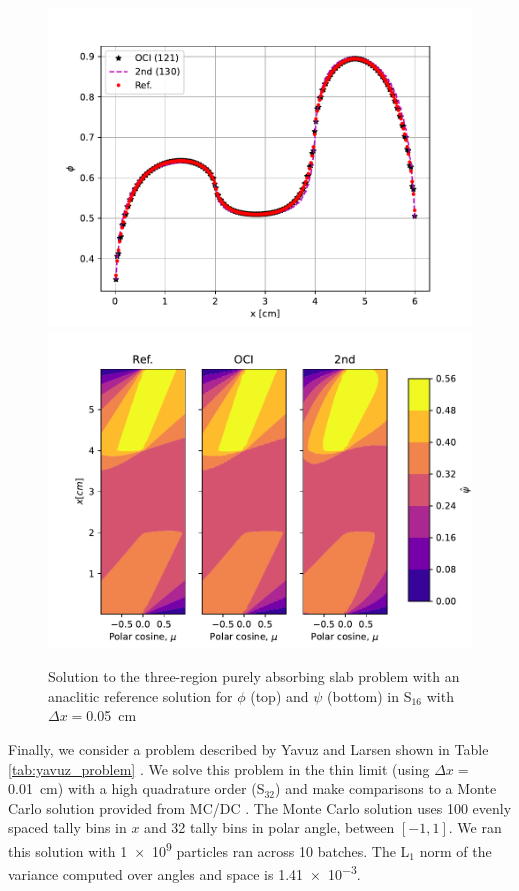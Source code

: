 \begin{figure}
    \centering
    \includegraphics[width=.75\linewidth]{figures/smm_paper/slab_abs_sf.pdf}
    \includegraphics[width=.75\linewidth]{figures/smm_paper/slab_abs_af.pdf}
    \caption{Solution to the three-region purely absorbing slab problem with an anaclitic reference solution for $\phi$ (top) and $\psi$ (bottom) in S$_{16}$ with $\Delta x =$\SI{0.05}{\centi\meter}}
    \label{fig:absorbium}
\end{figure}

Finally, we consider a problem described by Yavuz and Larsen shown in Table \ref{tab:yavuz_problem} \cite{yavuz_spatial_1989}.
We solve this problem in the thin limit (using $\Delta x=$ \SI{0.01}{\centi\meter}) with a high quadrature order (S$_{32}$) and make comparisons to a Monte Carlo solution provided from MC/DC \cite{morgan_monte_2024}.
The Monte Carlo solution uses 100 evenly spaced tally bins in $x$ and 32 tally bins in polar angle, between $[-1, 1]$.
We ran this solution with \num{1e9} particles ran across 10 batches.
The L$_1$ norm of the variance computed over angles and space is \num{1.41e-3}.

